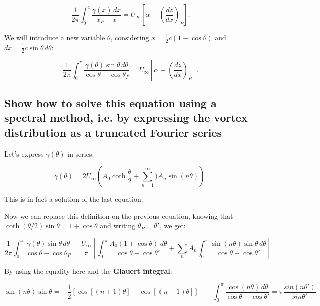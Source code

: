 \documentclass[british,french,11pt, a4paper, openany]{article}
\begin{document}
\begin{equation}
\frac{1}{2\pi} \int _0 ^c \frac{\gamma (x)\, dx}{x_P - x} = U_{\infty}\left[ \alpha -  \left(\frac{dz}{dx} \right)_P \right].
\end{equation}

We will introduce a new variable $\theta$, considering $x = \frac{1}{2}c (1-\cos \theta)$ and $dx = \frac{1}{2}c \sin \theta\, d\theta$: 

\begin{equation}
\frac{1}{2\pi} \int _0 ^{\pi} \frac{\gamma (\theta)\sin \theta \, d\theta}{\cos \theta - \cos \theta _P} = U_{\infty}\left[ \alpha -  \left(\frac{dz}{dx} \right)_P \right].
\label{eq:2.61}
\end{equation}

\subsection{Show how to solve this equation using a spectral method, i.e. by expressing
	the vortex distribution as a truncated Fourier series}


Let's express $\gamma (\theta )$ in series: 

\begin{equation}
\gamma (\theta ) = 2U_\infty \left(A_0 \coth \frac{\theta }{2} + \sum _{n=1}^\infty) A_n \sin (n\theta)\right).
\end{equation}

This is in fact a solution of the last equation. 

Now we can replace this definition on the previous equation, knowing that $\coth (\theta /2) \sin \theta = 1+\cos \theta$ and writing $\theta _P = \theta '$, we get:

\begin{equation}
\frac{1}{2\pi} \int _0 ^{\pi} \frac{\gamma (\theta)\sin \theta \, d\theta}{\cos \theta - \cos \theta _P}  = \frac{U_\infty}{\pi} \left[ \int _0 ^{\pi} \frac{A_0 (1+\cos \theta ) \, d\theta}{\cos \theta - \cos \theta '} + \sum _n A_n \int _0 ^{\pi}  \frac{\sin (n\theta)\sin \theta \, d\theta}{\cos \theta - \cos \theta '}  \right]
\end{equation}

By using the equality here and the \textbf{Glauert integral}:

\begin{equation}
\sin (n\theta ) \sin \theta = - \frac{1}{2} [\cos [(n+1)\theta] - \cos [(n-1)\theta]] \qquad \int _0 ^\pi \frac{\cos (n\theta)\, d\theta}{\cos \theta - \cos \theta '} = \pi \frac{sin(n\theta ')}{sin \theta '}
\end{equation}
\end{document}
